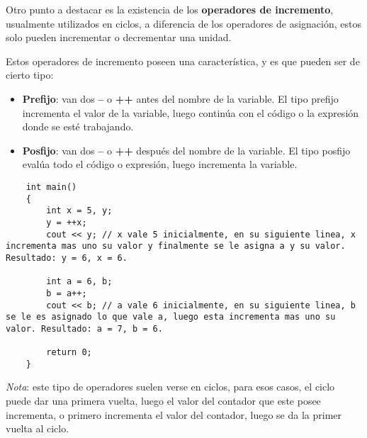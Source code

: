 Otro punto a destacar es la existencia de los \textbf{operadores de incremento}, usualmente utilizados en ciclos, a diferencia de los operadores de asignación, estos solo pueden incrementar o decrementar  una unidad.

Estos operadores de incremento poseen una característica, y es que pueden ser de cierto tipo:
\begin{itemize}
    \item \textbf{Prefijo}: van dos \textbf{--} o \textbf{++} antes del nombre de la variable. El tipo prefijo incrementa el valor de la variable, luego continúa con el código o la expresión donde se esté trabajando.
    \item \textbf{Posfijo}: van dos \textbf{--} o \textbf{++} después del nombre de la variable. El tipo posfijo evalúa todo el código o expresión, luego incrementa la variable.
\end{itemize}
\begin{lstlisting}
    int main()
    {
        int x = 5, y;
        y = ++x;
        cout << y; // x vale 5 inicialmente, en su siguiente linea, x incrementa mas uno su valor y finalmente se le asigna a y su valor. Resultado: y = 6, x = 6.
        
        int a = 6, b;
        b = a++;
        cout << b; // a vale 6 inicialmente, en su siguiente linea, b se le es asignado lo que vale a, luego esta incrementa mas uno su valor. Resultado: a = 7, b = 6.
        
        return 0;
    }
\end{lstlisting}

\textit{Nota}: este tipo de operadores suelen verse en ciclos, para esos casos, el ciclo puede dar una primera vuelta, luego el valor del contador que este posee incrementa, o primero incrementa el valor del contador, luego se da la primer vuelta al ciclo.
